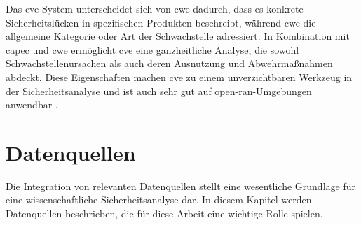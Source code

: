 Das \gls{cve}-System unterscheidet sich von \gls{cwe} dadurch, dass es konkrete Sicherheitslücken in spezifischen Produkten beschreibt, während \gls{cwe} die allgemeine Kategorie oder Art der Schwachstelle adressiert. In Kombination mit \gls{capec} und \gls{cwe} ermöglicht \gls{cve} eine ganzheitliche Analyse, die sowohl Schwachstellenursachen als auch deren Ausnutzung und Abwehrmaßnahmen abdeckt. Diese Eigenschaften machen \gls{cve} zu einem unverzichtbaren Werkzeug in der Sicherheitsanalyse und ist auch sehr gut auf \gls{open-ran}-Umgebungen anwendbar \cite{CVEWebsite}.

\section{Datenquellen}
\label{sec:datenquellen}
Die Integration von relevanten Datenquellen stellt eine wesentliche Grundlage für eine wissenschaftliche Sicherheitsanalyse dar. In diesem Kapitel werden Datenquellen beschrieben, die für diese Arbeit eine wichtige Rolle spielen.
